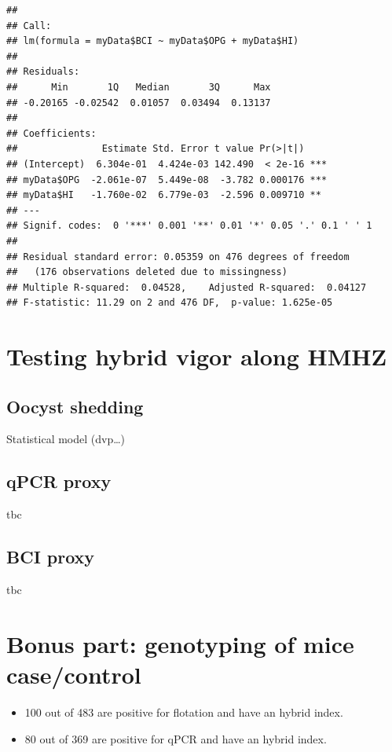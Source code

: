 \documentclass[]{article}
\begin{document}
\begin{verbatim}
## 
## Call:
## lm(formula = myData$BCI ~ myData$OPG + myData$HI)
## 
## Residuals:
##      Min       1Q   Median       3Q      Max 
## -0.20165 -0.02542  0.01057  0.03494  0.13137 
## 
## Coefficients:
##               Estimate Std. Error t value Pr(>|t|)    
## (Intercept)  6.304e-01  4.424e-03 142.490  < 2e-16 ***
## myData$OPG  -2.061e-07  5.449e-08  -3.782 0.000176 ***
## myData$HI   -1.760e-02  6.779e-03  -2.596 0.009710 ** 
## ---
## Signif. codes:  0 '***' 0.001 '**' 0.01 '*' 0.05 '.' 0.1 ' ' 1
## 
## Residual standard error: 0.05359 on 476 degrees of freedom
##   (176 observations deleted due to missingness)
## Multiple R-squared:  0.04528,    Adjusted R-squared:  0.04127 
## F-statistic: 11.29 on 2 and 476 DF,  p-value: 1.625e-05
\end{verbatim}

\section{Testing hybrid vigor along
HMHZ}\label{testing-hybrid-vigor-along-hmhz}

\subsection{Oocyst shedding}\label{oocyst-shedding}

Statistical model (dvp\ldots{})

\subsection{qPCR proxy}\label{qpcr-proxy}

tbc

\subsection{BCI proxy}\label{bci-proxy}

tbc

\section{Bonus part: genotyping of mice
case/control}\label{bonus-part-genotyping-of-mice-casecontrol}

\begin{itemize}
\item
  100 out of 483 are positive for flotation and have an hybrid index.
\item
  80 out of 369 are positive for qPCR and have an hybrid index.
\end{itemize}
\end{document}
